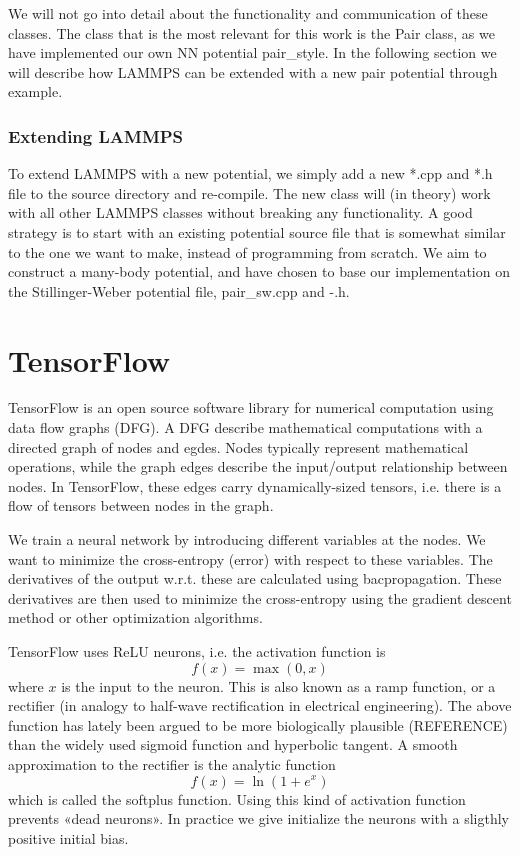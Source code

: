 \documentclass[twoside,english]{uiofysmaster}
\begin{document}
We will not go into detail about the functionality
and communication of these classes. The class
that is the most relevant for this work is the Pair class, 
as we have implemented our own NN potential pair\_style. 
In the following section we will describe how 
LAMMPS can be extended with a new pair potential
through example. 

\subsection{Extending LAMMPS}
To extend LAMMPS with a new potential, we 
simply add a new *.cpp and *.h file to the 
source directory and re-compile. The new class
will (in theory) work with all other LAMMPS 
classes without breaking any functionality. 
A good strategy is to start with an existing potential
source file that is somewhat similar to the one 
we want to make, instead of programming from scratch.
We aim to construct a many-body potential, and 
have chosen to base our implementation on the 
Stillinger-Weber potential file, pair\_sw.cpp and -.h.

\chapter{TensorFlow}
TensorFlow is an open source software library for numerical computation using data flow graphs (DFG). 
A DFG describe mathematical computations with a directed graph of nodes and egdes. Nodes typically represent mathematical
operations, while the graph edges describe the input/output relationship between nodes. In TensorFlow, these edges
carry dynamically-sized tensors, i.e. there is a flow of tensors between nodes in the graph. 

We train a neural network by introducing different variables at the nodes. We want to minimize the cross-entropy (error)
with respect to these variables. The derivatives of the output w.r.t. these are calculated using bacpropagation. These derivatives
are then used to minimize the cross-entropy using the gradient descent method or other optimization algorithms. 

TensorFlow uses ReLU neurons, i.e. the activation function is
\begin{equation}
 f(x) = \max(0,x)
\end{equation}
where $x$ is the input to the neuron. This is also known as a ramp function, or a rectifier (in analogy to half-wave
rectification in electrical engineering). 
The above function has lately been argued to be more biologically plausible (REFERENCE)
than the widely used sigmoid function and hyperbolic tangent. A smooth approximation to the rectifier is the analytic function
\begin{equation}
 f(x) = \ln(1 + e^x)
\end{equation}
which is called the softplus function. Using this kind of activation function prevents «dead neurons».
In practice we give initialize the neurons with a sligthly positive initial bias. 
\end{document}
